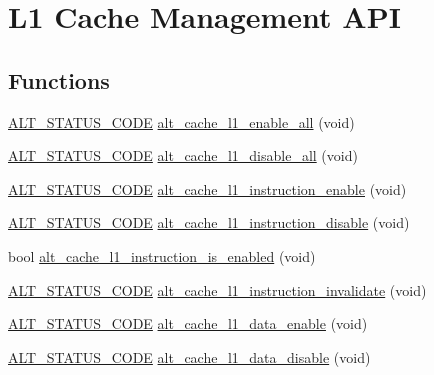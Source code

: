 \hypertarget{group__CACHE__L1}{}\section{L1 Cache Management A\+PI}
\label{group__CACHE__L1}
\subsection*{Functions}
\begin{DoxyCompactItemize}
\item 
\mbox{\hyperlink{hwlib_8h_abdb0d369f069723ca55d6c94bcaaaa12}{A\+L\+T\+\_\+\+S\+T\+A\+T\+U\+S\+\_\+\+C\+O\+DE}} \mbox{\hyperlink{group__CACHE__L1_gaf7e077788e68609d50abf4876fab8a45}{alt\+\_\+cache\+\_\+l1\+\_\+enable\+\_\+all}} (void)
\item 
\mbox{\hyperlink{hwlib_8h_abdb0d369f069723ca55d6c94bcaaaa12}{A\+L\+T\+\_\+\+S\+T\+A\+T\+U\+S\+\_\+\+C\+O\+DE}} \mbox{\hyperlink{group__CACHE__L1_ga11fb57c30d7d0db631d968f235da2683}{alt\+\_\+cache\+\_\+l1\+\_\+disable\+\_\+all}} (void)
\item 
\mbox{\hyperlink{hwlib_8h_abdb0d369f069723ca55d6c94bcaaaa12}{A\+L\+T\+\_\+\+S\+T\+A\+T\+U\+S\+\_\+\+C\+O\+DE}} \mbox{\hyperlink{group__CACHE__L1_ga42b3e61800effdf4f2c116a91b552cfc}{alt\+\_\+cache\+\_\+l1\+\_\+instruction\+\_\+enable}} (void)
\item 
\mbox{\hyperlink{hwlib_8h_abdb0d369f069723ca55d6c94bcaaaa12}{A\+L\+T\+\_\+\+S\+T\+A\+T\+U\+S\+\_\+\+C\+O\+DE}} \mbox{\hyperlink{group__CACHE__L1_ga6e68dac4309b352d857e6013f53c405e}{alt\+\_\+cache\+\_\+l1\+\_\+instruction\+\_\+disable}} (void)
\item 
bool \mbox{\hyperlink{group__CACHE__L1_ga29dc9df650120525447542d61753bf48}{alt\+\_\+cache\+\_\+l1\+\_\+instruction\+\_\+is\+\_\+enabled}} (void)
\item 
\mbox{\hyperlink{hwlib_8h_abdb0d369f069723ca55d6c94bcaaaa12}{A\+L\+T\+\_\+\+S\+T\+A\+T\+U\+S\+\_\+\+C\+O\+DE}} \mbox{\hyperlink{group__CACHE__L1_gac7c91159bfa1efb23f5f8b1c1a633050}{alt\+\_\+cache\+\_\+l1\+\_\+instruction\+\_\+invalidate}} (void)
\item 
\mbox{\hyperlink{hwlib_8h_abdb0d369f069723ca55d6c94bcaaaa12}{A\+L\+T\+\_\+\+S\+T\+A\+T\+U\+S\+\_\+\+C\+O\+DE}} \mbox{\hyperlink{group__CACHE__L1_ga7cf879a94e789a076a0ba1f8b53ba24c}{alt\+\_\+cache\+\_\+l1\+\_\+data\+\_\+enable}} (void)
\item 
\mbox{\hyperlink{hwlib_8h_abdb0d369f069723ca55d6c94bcaaaa12}{A\+L\+T\+\_\+\+S\+T\+A\+T\+U\+S\+\_\+\+C\+O\+DE}} \mbox{\hyperlink{group__CACHE__L1_gae64fca494fa175a89b253ab031d4bb87}{alt\+\_\+cache\+\_\+l1\+\_\+data\+\_\+disable}} (void)

\end{DoxyCompactItemize}
